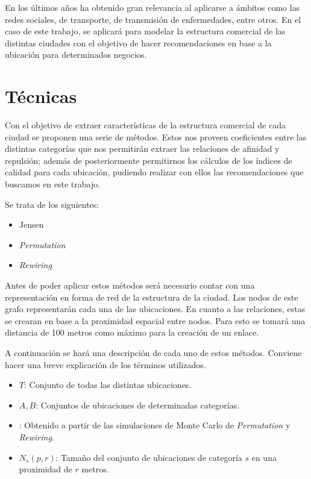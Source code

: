 En los últimos años ha obtenido gran relevancia al aplicarse a ámbitos como las redes sociales, de transporte, de transmisión de enfermedades, entre otros. En el caso de este trabajo, se aplicará para modelar la estructura comercial de las distintas ciudades con el objetivo de hacer recomendaciones en base a la ubicación para determinados negocios.


%


\section{Técnicas}
Con el objetivo de extraer características de la estructura comercial de cada ciudad se proponen una serie de métodos. Estos nos proveen coeficientes entre las distintas categorías que nos permitirán extraer las relaciones de afinidad y repulsión; además de posteriormente permitirnos los cálculos de los índices de calidad para cada ubicación, pudiendo realizar con ellos las recomendaciones que buscamos en este trabajo.

Se trata de los siguientes:
\begin{itemize}
	\item Jensen
	\item \textit{Permutation}
	\item \textit{Rewiring}
\end{itemize}


Antes de poder aplicar estos métodos será necesario contar con una representación en forma de red de la estructura de la ciudad. Los nodos de este grafo representarán cada una de las ubicaciones. En cuanto a las relaciones, estas se crearan en base a la proximidad espacial entre nodos. Para esto se tomará una distancia de 100 metros como máximo para la creación de un enlace.

A continuación se hará una descripción de cada uno de estos métodos. Conviene hacer una
breve explicación de los términos utilizados.
\begin{itemize}
	\item $T$: Conjunto de todas las distintas ubicaciones.
	\item $A,B$: Conjuntos de ubicaciones de determinadas categorías.
	\item {}: Obtenido a partir de las simulaciones de Monte Carlo de \textit{Permutation} y \textit{Rewiring}.
	\item $N_s(p,r)$: Tamaño del conjunto de ubicaciones de categoría $s$ en una proximidad de $r$ metros.
\end{itemize}


